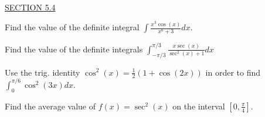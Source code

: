 \documentclass{exam}
\begin{document}
\begin{questions}
\begin{parts}
  \end{parts}



\ \\
\underline{SECTION 5.4}

\question Find the value of the definite integral $\displaystyle\int \frac{x^3\cos(x)}{x^6+3}dx$.

\question Find the value of the definite integrals $\displaystyle\int_{-\pi/3}^{\pi/3} \frac{x\sec(x)}{\sec^2(x) + 1} dx$ %

\question Use the trig. identity $\cos^2(x) = \frac{1}{2}\left( 1 + \cos(2x) \right)$ in order to find $\displaystyle\int_0^{\pi/6} \cos^2(3x) dx$. %

\question Find the average value of $f(x)=\sec^2(x)$ on the interval $\left[ 0, \frac{\pi}{4} \right]$.  %


\end{questions}
\end{document}
